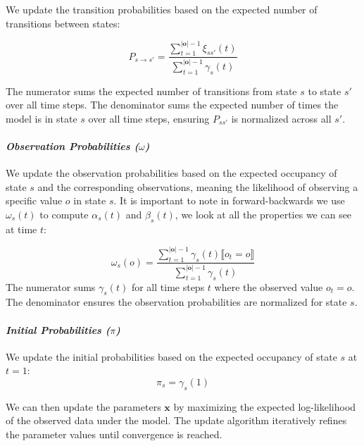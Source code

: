 We update the transition probabilities based on the expected number of transitions between states:


\begin{equation}
    P_{s \rightarrow s'} = \frac{\sum_{t = 1}^{|\mathbf{o}|-1} \xi_{ss'}(t)}{\sum_{t = 1}^{|\mathbf{o}|-1} \gamma_s(t)}
    \label{eq:transition-probabilities}
\end{equation}


The numerator sums the expected number of transitions from state $s$ to state $s'$ over all time steps.
The denominator sums the expected number of times the model is in state $s$ over all time steps, ensuring $P_{ss'}$ is normalized across all $s'$.

\paragraph*{\textit{Observation Probabilities ($\omega$)}}

We update the observation probabilities based on the expected occupancy of state $s$ and the corresponding observations, meaning the likelihood of observing a specific value $o$ in state $s$.
It is important to note in forward-backwards we use $\omega_s(t)$ to compute $\alpha_s(t)$ and $\beta_s(t)$, we look at all the properties we can see at time $t$:

\begin{equation}
    \omega_s(o) = \frac{\sum_{t = 1}^{|\mathbf{o}|-1} \gamma_s(t) \lBrack o_t = o \rBrack}{\sum_{t = 1}^{|\mathbf{o}|-1} \gamma_s(t)}
    \label{eq:omega}
\end{equation}
The numerator sums $\gamma_s(t)$ for all time steps $t$ where the observed value $o_t = o$.
The denominator ensures the observation probabilities are normalized for state $s$.

\paragraph*{\textit{Initial Probabilities ($\pi$)}}

We update the initial probabilities based on the expected occupancy of state $s$ at $t = 1$:
\begin{equation}
    \pi_s = \gamma_s(1)
    \label{eq:initial-probabilities}
\end{equation}

We can then update the parameters $\mathbf{x}$ by maximizing the expected log-likelihood of the observed data under the model.
The update algorithm iteratively refines the parameter values until convergence is reached.

